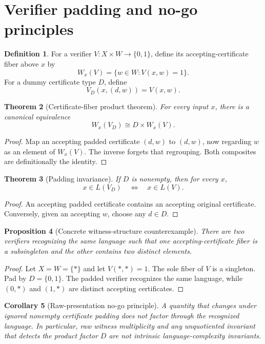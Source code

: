 \documentclass[11pt]{article}
\newtheorem{theorem}{Theorem}[section]
\newtheorem{proposition}[theorem]{Proposition}
\newtheorem{corollary}[theorem]{Corollary}
\theoremstyle{definition}
\newtheorem{definition}[theorem]{Definition}
\begin{document}
\section{Verifier padding and no-go principles}
\label{sec:padding}

\begin{definition}
For a verifier \(V:X\times W\to\{0,1\}\), define its accepting-certificate
fiber above \(x\) by
\[
 W_x(V)=\{w\in W:V(x,w)=1\}.
\]
For a dummy certificate type \(D\), define
\[
 V_D(x,(d,w))=V(x,w).
\]
\end{definition}

\begin{theorem}[Certificate-fiber product theorem]
For every input \(x\), there is a canonical equivalence
\[
 W_x(V_D)\cong D\times W_x(V).
\]
\end{theorem}

\begin{proof}
Map an accepting padded certificate \((d,w)\) to
\((d,w)\), now regarding \(w\) as an element of \(W_x(V)\). The inverse
forgets that regrouping. Both composites are definitionally the identity.
\end{proof}

\begin{theorem}[Padding invariance]
If \(D\) is nonempty, then for every \(x\),
\[
 x\in L(V_D)\quad\Longleftrightarrow\quad x\in L(V).
\]
\end{theorem}

\begin{proof}
An accepting padded certificate contains an accepting original certificate.
Conversely, given an accepting \(w\), choose any \(d\in D\).
\end{proof}

\begin{proposition}[Concrete witness-structure counterexample]
There are two verifiers recognizing the same language such that one
accepting-certificate fiber is a subsingleton and the other contains two
distinct elements.
\end{proposition}

\begin{proof}
Let \(X=W=\{*\}\) and let \(V(*,*)=1\). The sole fiber of \(V\) is a
singleton. Pad by \(D=\{0,1\}\). The padded verifier recognizes the same
language, while \((0,*)\) and \((1,*)\) are distinct accepting certificates.
\end{proof}

\begin{corollary}[Raw-presentation no-go principle]
A quantity that changes under ignored nonempty certificate padding does not
factor through the recognized language. In particular, raw witness
multiplicity and any unquotiented invariant that detects the product factor
\(D\) are not intrinsic language-complexity invariants.
\end{corollary}
\end{document}
